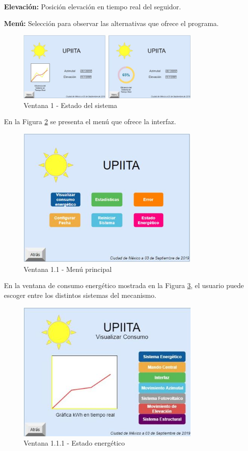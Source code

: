 \textbf{Elevación:} Posición elevación en tiempo real del seguidor.

\textbf{Menú:} Selección para observar las alternativas que ofrece el programa.
\begin{figure}[H]
	\centering
	\includegraphics[width=9cm]{imagenes/v1}
	\caption{Ventana 1 - Estado del sistema}
	\label{fig:v1}
\end{figure}

En la Figura \ref{fig:v11} se presenta el menú que ofrece la interfaz.
\begin{figure}[H]
	\centering
	\includegraphics[width=9cm]{imagenes/v11}
	\caption{Ventana 1.1 - Menú principal}
	\label{fig:v11}
\end{figure}

En la ventana de consumo energético mostrada en la Figura \ref{fig:v111}, el usuario puede escoger entre los distintos sistemas del mecanismo.
\begin{figure}[H]
	\centering
	\includegraphics[width=9cm]{imagenes/v111}
	\caption{Ventana 1.1.1 - Estado energético}
	\label{fig:v111}
\end{figure}


